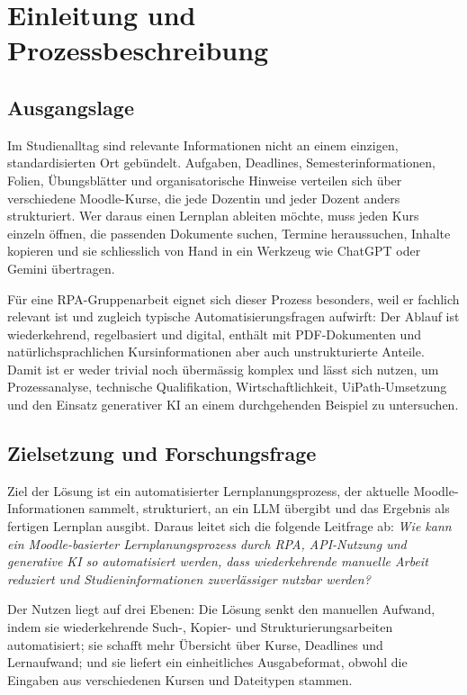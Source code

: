 \documentclass[11pt]{scrartcl}
\begin{document}


\newpage
\tableofcontents
\newpage

\section{Einleitung und Prozessbeschreibung}
\subsection{Ausgangslage}
Im Studienalltag sind relevante Informationen nicht an einem einzigen, standardisierten Ort gebündelt. Aufgaben, Deadlines, Semesterinformationen, Folien, Übungsblätter und organisatorische Hinweise verteilen sich über verschiedene Moodle-Kurse, die jede Dozentin und jeder Dozent anders strukturiert. Wer daraus einen Lernplan ableiten möchte, muss jeden Kurs einzeln öffnen, die passenden Dokumente suchen, Termine heraussuchen, Inhalte kopieren und sie schliesslich von Hand in ein Werkzeug wie ChatGPT oder Gemini übertragen.

Für eine RPA-Gruppenarbeit eignet sich dieser Prozess besonders, weil er fachlich relevant ist und zugleich typische Automatisierungsfragen aufwirft: Der Ablauf ist wiederkehrend, regelbasiert und digital, enthält mit PDF-Dokumenten und natürlichsprachlichen Kursinformationen aber auch unstrukturierte Anteile. Damit ist er weder trivial noch übermässig komplex und lässt sich nutzen, um Prozessanalyse, technische Qualifikation, Wirtschaftlichkeit, UiPath-Umsetzung und den Einsatz generativer KI an einem durchgehenden Beispiel zu untersuchen.

\subsection{Zielsetzung und Forschungsfrage}
Ziel der Lösung ist ein automatisierter Lernplanungsprozess, der aktuelle Moodle-Informationen sammelt, strukturiert, an ein LLM übergibt und das Ergebnis als fertigen Lernplan ausgibt. Daraus leitet sich die folgende Leitfrage ab: \emph{Wie kann ein Moodle-basierter Lernplanungsprozess durch RPA, API-Nutzung und generative KI so automatisiert werden, dass wiederkehrende manuelle Arbeit reduziert und Studieninformationen zuverlässiger nutzbar werden?}

Der Nutzen liegt auf drei Ebenen: Die Lösung senkt den manuellen Aufwand, indem sie wiederkehrende Such-, Kopier- und Strukturierungsarbeiten automatisiert; sie schafft mehr Übersicht über Kurse, Deadlines und Lernaufwand; und sie liefert ein einheitliches Ausgabeformat, obwohl die Eingaben aus verschiedenen Kursen und Dateitypen stammen.
\end{document}
